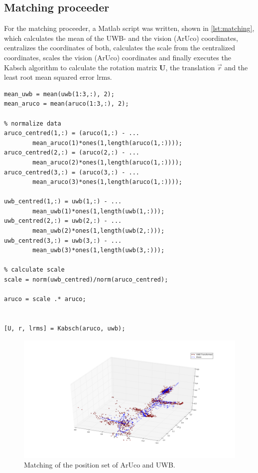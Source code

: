 \subsection{Matching proceeder}\label{subsec:matching}
For the matching proceeder, a Matlab script was written, shown in \autoref{lst:matching}, which calculates the mean of the UWB- and the vision (ArUco) coordinates, centralizes the coordinates of both, calculates the scale from the centralized coordinates, scales the vision (ArUco) coordinates and finally executes the Kabsch algorithm to calculate the rotation matrix $\textbf{U}$, the translation $\vec r$ and the least root mean squared error $\text{lrms}$.

\lstset{language=Matlab}
\begin{lstlisting}[frame=single, caption=Matching proceeder, label=lst:matching]
% Calculate mean
mean_uwb = mean(uwb(1:3,:), 2);
mean_aruco = mean(aruco(1:3,:), 2);
	
% normalize data	
aruco_centred(1,:) = (aruco(1,:) - ...
		mean_aruco(1)*ones(1,length(aruco(1,:))));
aruco_centred(2,:) = (aruco(2,:) - ...
		mean_aruco(2)*ones(1,length(aruco(1,:))));
aruco_centred(3,:) = (aruco(3,:) - ...
		mean_aruco(3)*ones(1,length(aruco(1,:))));

uwb_centred(1,:) = uwb(1,:) - ...
		mean_uwb(1)*ones(1,length(uwb(1,:)));
uwb_centred(2,:) = uwb(2,:) - ...
		mean_uwb(2)*ones(1,length(uwb(2,:)));
uwb_centred(3,:) = uwb(3,:) - ...
		mean_uwb(3)*ones(1,length(uwb(3,:)));
	
% calculate scale
scale = norm(uwb_centred)/norm(aruco_centred);
	
aruco = scale .* aruco;
	
	
[U, r, lrms] = Kabsch(aruco, uwb);
\end{lstlisting}

\begin{figure}[h]\centering
	\includegraphics[width=1.0\textwidth]{figures/matching}
	\caption{Matching of the position set of ArUco and UWB.}\label{fig:matching}
\end{figure} 

